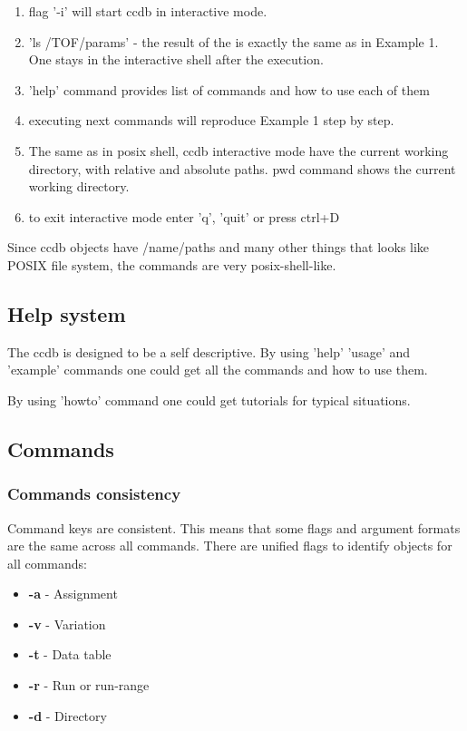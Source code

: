 \documentclass{article}
\begin{document}
\begin{enumerate}
  \item flag '-i'  will start ccdb in interactive mode.

  \item 'ls /TOF/params' - the result of the is exactly the same as in Example 1.
         One stays in the interactive shell after the execution.

  \item 'help' command provides list of commands and how to use each of them

  \item executing next commands will reproduce Example 1 step by step.

  \item  The same as in posix shell, ccdb interactive mode have the current
         working directory, with relative and absolute paths.
         pwd command shows the current working directory.

  \item to exit interactive mode enter 'q', 'quit' or press ctrl+D
\end{enumerate}

Since ccdb objects have /name/paths and many other things that looks like
POSIX file system, the commands are very posix-shell-like.


\subsection{Help system}

The ccdb is designed to be a self descriptive. By using 'help' 'usage' and 'example' commands
one could get all the commands and how to use them.

By using 'howto' command one could get tutorials for typical situations.


\subsection{Commands}

\subsubsection{Commands consistency}

Command keys are consistent. This means that some flags and argument formats
are the same across all commands. There are unified flags to identify objects for all commands:
\begin{itemize}
  \item \textbf{-a} - Assignment
  \item \textbf{-v} - Variation
  \item \textbf{-t} - Data table
  \item \textbf{-r} - Run or run-range
  \item \textbf{-d} - Directory
\end{itemize}
\end{document}
